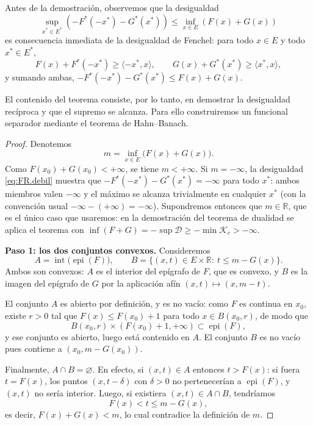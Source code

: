 \documentclass[12pt, a4paper]{amsbook}
\newcommand{\R}{{\mathbb R}}
\newcommand{\D}{{\mathcal D}}
\theoremstyle{remark}
\theoremstyle{definition}
\numberwithin{section}{chapter}
\numberwithin{subsection}{section}
\numberwithin{equation}{section}
\numberwithin{figure}{chapter}
\begin{document}
Antes de la demostración, observemos que la desigualdad
\begin{equation}\label{eq:FR.debil}
\sup_{x^*\in E^*}
\left(
-F^*(-x^*)
-
G^*(x^*)
\right)
\le
\inf_{x\in E}
(F(x)+G(x))
\end{equation}
es consecuencia inmediata de la desigualdad de Fenchel: para todo $x\in E$ y
todo $x^*\in E^*$,
\[
F(x)+F^*(-x^*)\ge\langle -x^*,x\rangle,
\qquad
G(x)+G^*(x^*)\ge\langle x^*,x\rangle,
\]
y sumando ambas, $-F^*(-x^*)-G^*(x^*)\le F(x)+G(x)$.

El contenido del teorema consiste, por lo tanto, en demostrar la desigualdad
recíproca y que el supremo se alcanza. Para ello construiremos un funcional
separador mediante el teorema de Hahn--Banach.

\begin{proof}
Denotemos
\[
m=\inf_{x\in E}\bigl(F(x)+G(x)\bigr).
\]
Como $F(x_0)+G(x_0)<+\infty$, se tiene $m<+\infty$. Si $m=-\infty$, la
desigualdad \eqref{eq:FR.debil} muestra que $-F^*(-x^*)-G^*(x^*)=-\infty$ para
todo $x^*$: ambos miembros valen $-\infty$ y el máximo se alcanza
trivialmente en cualquier $x^*$ (con la convención usual
$-\infty-(+\infty)=-\infty$). Supondremos entonces que $m\in\R$, que es el
único caso que usaremos: en la demostración del teorema de dualidad se aplica
el teorema con $\inf(F+G)=-\sup\D\ge-\min\mathcal K_c>-\infty$.

\medskip
\textbf{Paso 1: los dos conjuntos convexos.}
Consideremos
\[
A=\operatorname{int}\bigl(\operatorname{epi}(F)\bigr),
\qquad
B=\{(x,t)\in E\times\R:\ t\le m-G(x)\}.
\]
Ambos son convexos: $A$ es el interior del epígrafo de $F$, que es convexo, y
$B$ es la imagen del epígrafo de $G$ por la aplicación afín
$(x,t)\mapsto(x,m-t)$.

El conjunto $A$ es abierto por definición, y es no vacío: como $F$ es continua
en $x_0$, existe $r>0$ tal que $F(x)\le F(x_0)+1$ para todo $x\in B(x_0,r)$,
de modo que
\begin{equation}\label{eq:FR.A}
B(x_0,r)\times(F(x_0)+1,+\infty)\subset\operatorname{epi}(F),
\end{equation}
y ese conjunto es abierto, luego está contenido en $A$. El conjunto $B$ es no
vacío pues contiene a $(x_0,m-G(x_0))$.

Finalmente, $A\cap B=\varnothing$. En efecto, si $(x,t)\in A$ entonces
$t>F(x)$: si fuera $t=F(x)$, los puntos $(x,t-\delta)$ con $\delta>0$ no
pertenecerían a $\operatorname{epi}(F)$, y $(x,t)$ no sería interior. Luego, si
existiera $(x,t)\in A\cap B$, tendríamos
\[
F(x)<t\le m-G(x),
\]
es decir, $F(x)+G(x)<m$, lo cual contradice la definición de $m$.


\end{proof}
\end{document}
